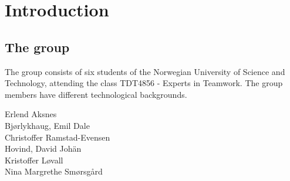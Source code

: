 \chapter{Introduction}
\section{The group}
The group consists of six students of the Norwegian University of Science and Technology, attending the class TDT4856 - Experts in Teamwork. The group members have different technological backgrounds.
\begin{description}
	\item[Erlend Aksnes] %
	\item[Bjørlykhaug, Emil Dale] %
	\item[Christoffer Ramstad-Evensen] %
	\item[Hovind, David Johän] %
	\item[Kristoffer Løvall] %
	\item[Nina Margrethe Smørsgård] %
\end{description}